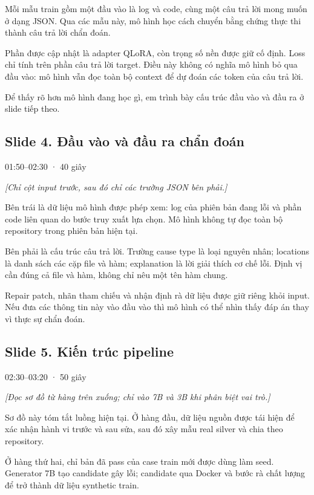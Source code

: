 \documentclass[12pt,a4paper]{article}
\begin{document}
Mỗi mẫu train gồm một đầu vào là log và code, cùng một câu trả lời mong muốn ở dạng JSON. Qua các mẫu này, mô hình học cách chuyển bằng chứng thực thi thành câu trả lời chẩn đoán.

Phần được cập nhật là adapter QLoRA, còn trọng số nền được giữ cố định. Loss chỉ tính trên phần câu trả lời target. Điều này không có nghĩa mô hình bỏ qua đầu vào: mô hình vẫn đọc toàn bộ context để dự đoán các token của câu trả lời.

Để thấy rõ hơn mô hình đang học gì, em trình bày cấu trúc đầu vào và đầu ra ở slide tiếp theo.

\subsection*{Slide 4. Đầu vào và đầu ra chẩn đoán}
{\small\color{gray}01:50–02:30 · 40 giây}\par
{\itshape\color{gray}[Chỉ cột input trước, sau đó chỉ các trường JSON bên phải.]}\par
Bên trái là dữ liệu mô hình được phép xem: log của phiên bản đang lỗi và phần code liên quan do bước truy xuất lựa chọn. Mô hình không tự đọc toàn bộ repository trong phiên bản hiện tại.

Bên phải là cấu trúc câu trả lời. Trường cause type là loại nguyên nhân; locations là danh sách các cặp file và hàm; explanation là lời giải thích cơ chế lỗi. Định vị cần đúng cả file và hàm, không chỉ nêu một tên hàm chung.

Repair patch, nhãn tham chiếu và nhận định rà dữ liệu được giữ riêng khỏi input. Nếu đưa các thông tin này vào đầu vào thì mô hình có thể nhìn thấy đáp án thay vì thực sự chẩn đoán.

\clearpage
\subsection*{Slide 5. Kiến trúc pipeline}
{\small\color{gray}02:30–03:20 · 50 giây}\par
{\itshape\color{gray}[Đọc sơ đồ từ hàng trên xuống; chỉ vào 7B và 3B khi phân biệt vai trò.]}\par
Sơ đồ này tóm tắt luồng hiện tại. Ở hàng đầu, dữ liệu nguồn được tái hiện để xác nhận hành vi trước và sau sửa, sau đó xây mẫu real silver và chia theo repository.

Ở hàng thứ hai, chỉ bản đã pass của case train mới được dùng làm seed. Generator 7B tạo candidate gây lỗi; candidate qua Docker và bước rà chất lượng để trở thành dữ liệu synthetic train.
\end{document}

